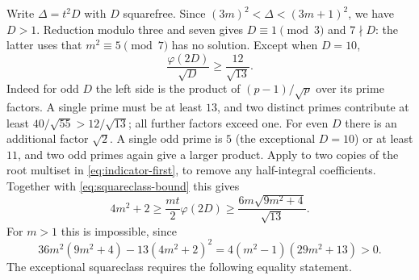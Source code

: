 Write $\Delta=t^2D$ with $D$ squarefree. Since
$(3m)^2<\Delta<(3m+1)^2$, we have $D>1$. Reduction modulo three and
seven gives $D\equiv1\pmod3$ and $7\nmid D$: the latter uses that
$m^2\equiv5\pmod7$ has no solution.
Except when $D=10$,
\begin{equation}
 \frac{\varphi(2D)}{\sqrt D}\ge\frac{12}{\sqrt{13}}.
 \label{eq:squareclass-bound}
\end{equation}
Indeed for odd $D$ the left side is the product of
$(p-1)/\sqrt p$ over its prime factors. A single prime must be at
least $13$, and two distinct primes contribute at least
$40/\sqrt{55}>12/\sqrt{13}$; all further factors exceed one.
For even $D$ there is an additional factor $\sqrt2$.
A single odd prime is $5$ (the exceptional $D=10$) or at least $11$,
and two odd primes again give a larger product.
Apply \cite[Theorem~1.3]{Larson} to two copies of the root multiset in
\eqref{eq:indicator-first}, to remove any half-integral coefficients.
Together with \eqref{eq:squareclass-bound} this gives
\[
 4m^2+2\ge\frac{mt}{2}\varphi(2D)
 \ge\frac{6m\sqrt{9m^2+4}}{\sqrt{13}}.
\]
For $m>1$ this is impossible, since
\[
 36m^2(9m^2+4)-13(4m^2+2)^2
 =4(m^2-1)(29m^2+13)>0.
\]
The exceptional squareclass requires the following equality statement.

